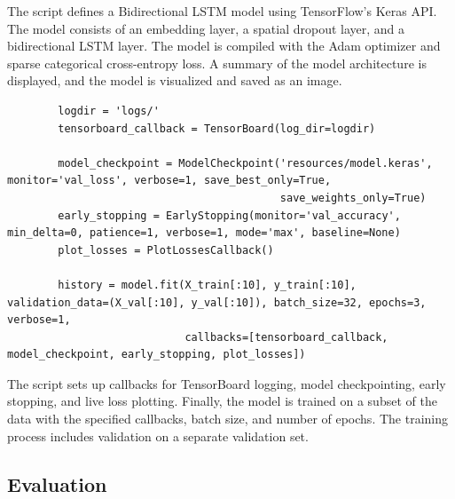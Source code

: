 \documentclass{solutionclass} %
\begin{document}
\begin{solution}
        The script defines a Bidirectional LSTM model using TensorFlow's Keras API. The model consists of an embedding layer, a spatial dropout layer, and a bidirectional LSTM layer. The model is compiled with the Adam optimizer and sparse categorical cross-entropy loss. A summary of the model architecture is displayed, and the model is visualized and saved as an image.
        
        \begin{lstlisting}
        logdir = 'logs/'
        tensorboard_callback = TensorBoard(log_dir=logdir)
        
        model_checkpoint = ModelCheckpoint('resources/model.keras', monitor='val_loss', verbose=1, save_best_only=True,
                                           save_weights_only=True)
        early_stopping = EarlyStopping(monitor='val_accuracy', min_delta=0, patience=1, verbose=1, mode='max', baseline=None)
        plot_losses = PlotLossesCallback()
        
        history = model.fit(X_train[:10], y_train[:10], validation_data=(X_val[:10], y_val[:10]), batch_size=32, epochs=3, verbose=1,
                            callbacks=[tensorboard_callback, model_checkpoint, early_stopping, plot_losses])
        \end{lstlisting}
        
        The script sets up callbacks for TensorBoard logging, model checkpointing, early stopping, and live loss plotting. Finally, the model is trained on a subset of the data with the specified callbacks, batch size, and number of epochs. The training process includes validation on a separate validation set.

        

\end{solution}




\subsection*{Evaluation}
\end{document}
